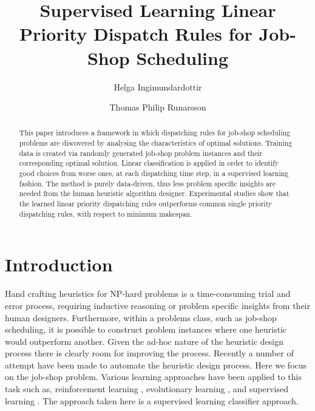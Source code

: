 \documentclass[10pt]{llncs}
\title{Supervised Learning Linear Priority Dispatch Rules for Job-Shop Scheduling}
\author{Helga Ingimundardottir \and Thomas Philip Runarsson}
\institute{{School of Engineering and Natural Sciences, University of Iceland}\\
\email{hei2@hi.is} and \email{tpr@hi.is}}
\begin{document}
\maketitle


\begin{abstract}
This paper introduces a framework in which dispatching rules for job-shop scheduling problems are discovered by analysing the characteristics of optimal solutions. Training data is created via randomly generated job-shop problem instances and their corresponding optimal solution. Linear classification is applied in order to identify good choices from worse ones, at each dispatching time step, in a supervised learning fashion.  The method is purely data-driven, thus less problem specific insights are needed from the human heuristic algorithm designer.  Experimental studies show that the learned linear priority dispatching rules outperforms common single priority dispatching rules, with respect to minimum makespan.
\end{abstract}

\section{Introduction}\label{sec:introduction}

Hand crafting heuristics for NP-hard problems is a time-consuming trial and error process, requiring inductive reasoning or problem specific insights from their human designers. Furthermore, within a problems class, such as job-shop scheduling, it is possible to construct problem instances where one heuristic would outperform another. Given the ad-hoc nature of the heuristic design process there is clearly room for improving the process. Recently a number of attempt have been made to automate the heuristic design process. Here we focus on the job-shop problem. Various learning approaches have been applied to this task such as, reinforcement learning \cite{Dietterich1995}, evolutionary learning \cite{Tay2008}, and supervised learning \cite{Li2005,Malik2007}. The approach taken here is a supervised learning classifier approach.
 
\end{document}
